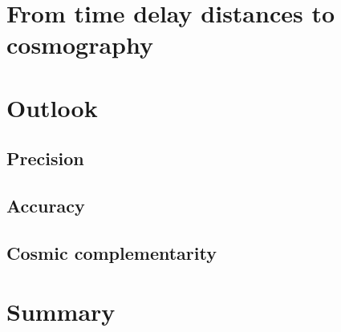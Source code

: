 
\section{From time delay distances to cosmography}
\label{sec:cosmo}





\section{Outlook}
\label{sec:cosmo}



\subsection{Precision}




\subsection{Accuracy}



\subsection{Cosmic complementarity}



\section{Summary}
\label{sec:summary}

